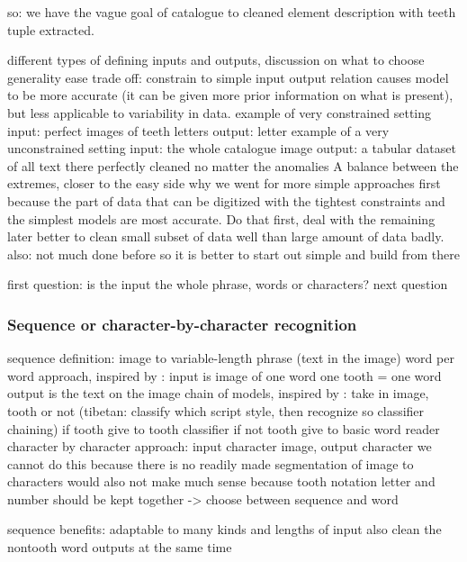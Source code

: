 \documentclass{article}
\begin{document}
so: we have the vague goal of catalogue to cleaned element description with teeth tuple extracted.


different types of defining inputs and outputs, discussion on what to choose
generality ease trade off: constrain to simple input output relation causes model to be 
more accurate (it can be given more prior information on what is present), but less applicable 
to variability in data.
example of very constrained setting
    input: perfect images of teeth letters
    output: letter
example of a very unconstrained setting
    input: the whole catalogue image
    output: a tabular dataset of all text there perfectly cleaned no matter the anomalies
A balance between the extremes, closer to the easy side
why we went for more simple approaches first
    because the part of data that can be digitized with the tightest constraints and the simplest models are most accurate. Do that first, deal with the remaining later
    better to clean small subset of data well than large amount of data badly.
    also: not much done before so it is better to start out simple and build from there

first question: is the input the whole phrase, words or characters? next question

\subsubsection{Sequence or character-by-character recognition}

sequence definition: image to variable-length phrase (text in the image)
word per word approach, inspired by \cite{tibetan_ocr}:
    input is image of one word
        one tooth = one word
    output is the text on the image
    chain of models, inspired by \cite{tibetan_ocr}: take in image, tooth or not
        (tibetan: classify which script style, then recognize so classifier chaining)
        if tooth give to tooth classifier 
        if not tooth give to basic word reader
character by character approach: input character image, output character 
    we cannot do this because there is no readily made segmentation of image to characters 
    would also not make much sense because tooth notation letter and number should be kept together
    -> choose between sequence and word

sequence benefits:
    adaptable to many kinds and lengths of input
    also clean the nontooth word outputs at the same time
\end{document}
